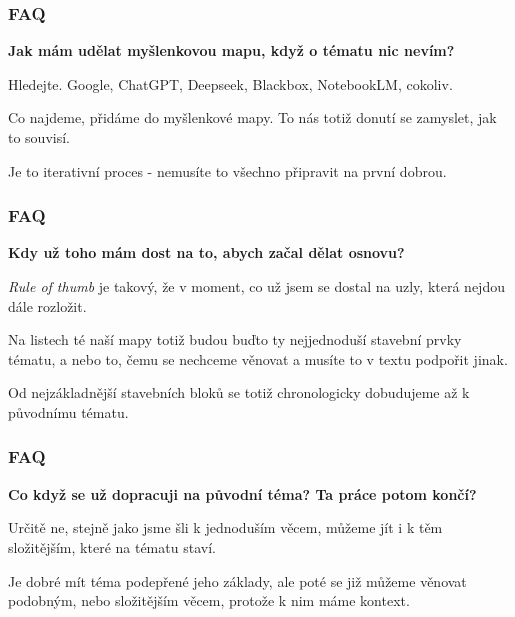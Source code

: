 \documentclass[FM]{tulpresentation}
\begin{document}
	\begin{frame}
		\frametitle{FAQ}
		\begin{items}
			\item \textbf{Jak mám udělat myšlenkovou mapu, když o tématu nic nevím?}
			\begin{subitems}
				\item Hledejte. Google, ChatGPT, Deepseek, Blackbox, NotebookLM, cokoliv.
				\item Co najdeme, přidáme do myšlenkové mapy. To nás totiž donutí se zamyslet, jak to souvisí.
				\item Je to iterativní proces - nemusíte to všechno připravit na první dobrou.
			\end{subitems}
		\end{items}
	\end{frame}
	
	\begin{frame}
		\frametitle{FAQ}
		\begin{items}
			\item \textbf{Kdy už toho mám dost na to, abych začal dělat osnovu?}
			\begin{subitems}
				\item \textit{Rule of thumb} je takový, že v moment, co už jsem se dostal na uzly, která nejdou dále rozložit.
				\item Na listech té naší mapy totiž budou buďto ty nejjednoduší stavební prvky tématu, a nebo to, čemu se nechceme věnovat a musíte to v textu podpořit jinak.
				\item Od nejzákladnější stavebních bloků se totiž chronologicky dobudujeme až k původnímu tématu.
			\end{subitems}
		\end{items}
	\end{frame}
	
	\begin{frame}
		\frametitle{FAQ}
		\begin{items}
			\item \textbf{Co když se už dopracuji na původní téma? Ta práce potom končí?}
			\begin{subitems}
				\item Určitě ne, stejně jako jsme šli k jednoduším věcem, můžeme jít i k těm složitějším, které na tématu staví.
				\item Je dobré mít téma podepřené jeho základy, ale poté se již můžeme věnovat podobným, nebo složitějším věcem, protože k nim máme kontext.
			\end{subitems}
		\end{items}
	\end{frame}
  \TULendframe
\end{document}
